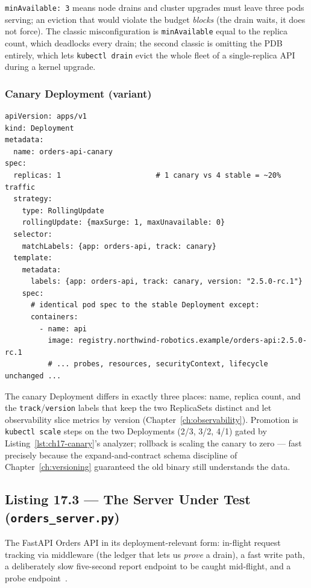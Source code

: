 \texttt{minAvailable: 3} means node drains and cluster upgrades must
leave three pods serving; an eviction that would violate the budget
\emph{blocks} (the drain waits, it does not force). The classic
misconfiguration is \texttt{minAvailable} equal to the replica count,
which deadlocks every drain; the second classic is omitting the PDB
entirely, which lets \texttt{kubectl drain} evict the whole fleet of a
single-replica API during a kernel upgrade.

\subsubsection*{Canary Deployment (variant)}
\label{lst:ch17-canary-deploy}

\begin{verbatim}
apiVersion: apps/v1
kind: Deployment
metadata:
  name: orders-api-canary
spec:
  replicas: 1                      # 1 canary vs 4 stable = ~20% traffic
  strategy:
    type: RollingUpdate
    rollingUpdate: {maxSurge: 1, maxUnavailable: 0}
  selector:
    matchLabels: {app: orders-api, track: canary}
  template:
    metadata:
      labels: {app: orders-api, track: canary, version: "2.5.0-rc.1"}
    spec:
      # identical pod spec to the stable Deployment except:
      containers:
        - name: api
          image: registry.northwind-robotics.example/orders-api:2.5.0-rc.1
          # ... probes, resources, securityContext, lifecycle unchanged ...
\end{verbatim}

The canary Deployment differs in exactly three places: name, replica
count, and the \texttt{track}/\texttt{version} labels that keep the two
ReplicaSets distinct and let observability slice metrics by version
(Chapter~\ref{ch:observability}). Promotion is \texttt{kubectl scale}
steps on the two Deployments (2/3, 3/2, 4/1) gated by
Listing~\ref{lst:ch17-canary}'s analyzer; rollback is scaling the canary
to zero --- fast precisely because the expand-and-contract schema
discipline of Chapter~\ref{ch:versioning} guaranteed the old binary still
understands the data.

\subsection{Listing 17.3 --- The Server Under Test (\texttt{orders\_server.py})}
\label{sec:ch17-server}
\label{lst:ch17-server}

The FastAPI Orders API in its deployment-relevant form: in-flight request
tracking via middleware (the ledger that lets us \emph{prove} a drain),
a fast write path, a deliberately slow five-second report endpoint to be
caught mid-flight, and a probe endpoint~\cite{fastapidocs}.

